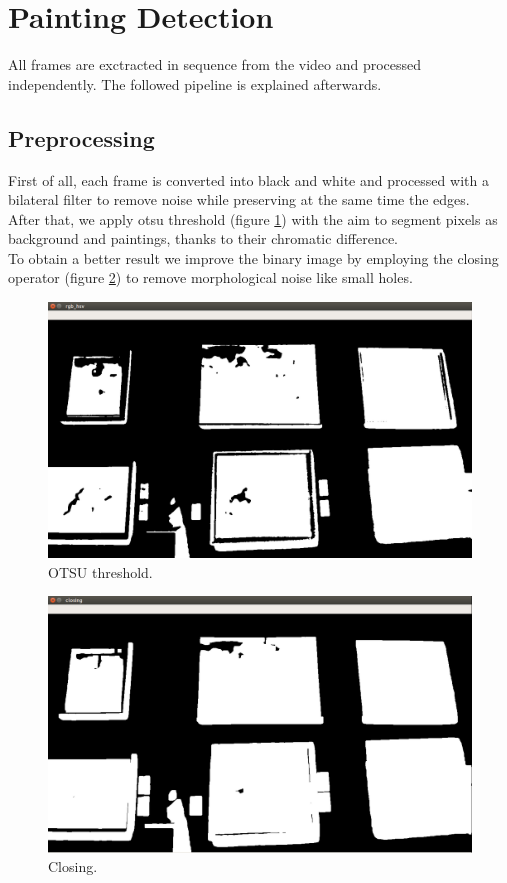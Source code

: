 \documentclass[conference]{IEEEtran}
\begin{document}
\section{Painting Detection}
All frames are exctracted in sequence from the video and processed independently. The followed pipeline is explained afterwards.

\subsection{Preprocessing}
First of all, each frame is converted into black and white and processed with a bilateral filter to remove noise while preserving at the same time the edges.\\
After that, we apply otsu threshold (figure \ref{fig:1_otsu_threshold}) with the aim to segment pixels as background and paintings, thanks to their chromatic difference.\\
To obtain a better result we improve the binary image by employing the closing operator (figure \ref{fig:2_closing}) to remove morphological noise like small holes.\\ 

\bigskip


\begin{figure}[htbp]
  \centering
  \includegraphics[width=0.8\columnwidth]{../detection_pipeline/1_otsu_threshold.png}
  \caption{OTSU threshold.}
  \label{fig:1_otsu_threshold}
\end{figure}

\bigskip

\begin{figure}[htbp]
  \centering
  \includegraphics[width=0.8\columnwidth]{../detection_pipeline/2_closing.png}
  \caption{Closing.}
  \label{fig:2_closing}
\end{figure}
\end{document}

